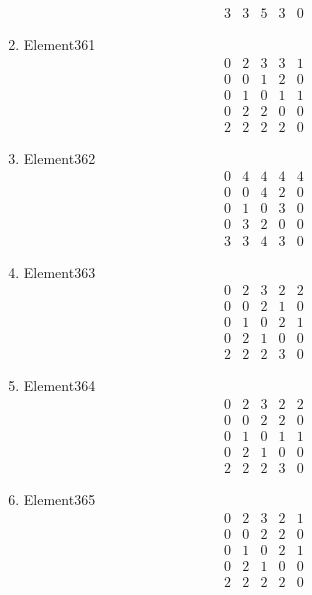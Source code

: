 \documentclass[12pt]{article}
\begin{document}
\begin{multicols}{3}
\begin{enumerate}
\begin{equation*}
\begin{array}{ccccc}
3&3&5&3&0
\end{array}
\end{equation*}
\item Element361
\begin{equation*}
\begin{array}{ccccc}
0&2&3&3&1\\
0&0&1&2&0\\
0&1&0&1&1\\
0&2&2&0&0\\
2&2&2&2&0
\end{array}
\end{equation*}
\item Element362
\begin{equation*}
\begin{array}{ccccc}
0&4&4&4&4\\
0&0&4&2&0\\
0&1&0&3&0\\
0&3&2&0&0\\
3&3&4&3&0
\end{array}
\end{equation*}
\item Element363
\begin{equation*}
\begin{array}{ccccc}
0&2&3&2&2\\
0&0&2&1&0\\
0&1&0&2&1\\
0&2&1&0&0\\
2&2&2&3&0
\end{array}
\end{equation*}
\item Element364
\begin{equation*}
\begin{array}{ccccc}
0&2&3&2&2\\
0&0&2&2&0\\
0&1&0&1&1\\
0&2&1&0&0\\
2&2&2&3&0
\end{array}
\end{equation*}
\item Element365
\begin{equation*}
\begin{array}{ccccc}
0&2&3&2&1\\
0&0&2&2&0\\
0&1&0&2&1\\
0&2&1&0&0\\
2&2&2&2&0
\end{array}
\end{equation*}

\end{enumerate}
\end{multicols}
\end{document}
